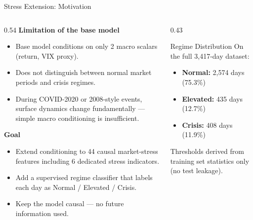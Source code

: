 \documentclass[aspectratio=169,10pt]{beamer}
\begin{document}
\begin{frame}{Stress Extension: Motivation}
  \begin{columns}[T]
    \begin{column}{0.54\textwidth}
      \textbf{Limitation of the base model}
      \begin{itemize}\itemsep3pt
        \item Base model conditions on only 2 macro scalars (return, VIX proxy).
        \item Does not distinguish between normal market periods and crisis regimes.
        \item During COVID-2020 or 2008-style events, surface dynamics change fundamentally --- simple macro conditioning is insufficient.
      \end{itemize}
      \vspace{4pt}
      \textbf{Goal}
      \begin{itemize}\itemsep3pt
        \item Extend conditioning to 44 causal market-stress features including 6 dedicated stress indicators.
        \item Add a \alert{supervised regime classifier} that labels each day as Normal / Elevated / Crisis.
        \item Keep the model causal --- no future information used.
      \end{itemize}
    \end{column}
    \begin{column}{0.43\textwidth}
      \begin{block}{Regime Distribution}
        \footnotesize
        On the full 3,417-day dataset:
        \begin{itemize}\itemsep3pt
          \item \textbf{Normal:} 2,574 days (75.3\%)
          \item \textbf{Elevated:} 435 days (12.7\%)
          \item \textbf{Crisis:} 408 days (11.9\%)
        \end{itemize}
        \vspace{3pt}
        Thresholds derived from training set statistics only (no test leakage).
      \end{block}
    \end{column}
  \end{columns}
\end{frame}
\end{document}
